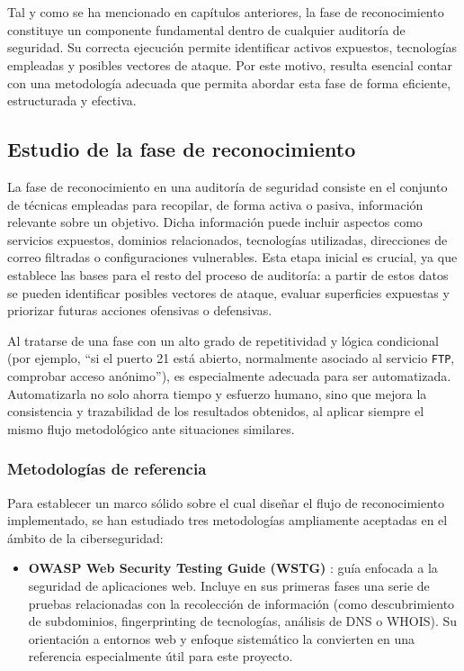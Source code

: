 \chapter{\methodologyname}
\newpage
\begin{parskipenv}
Tal y como se ha mencionado en capítulos anteriores, la fase de reconocimiento constituye un componente fundamental dentro de cualquier auditoría de seguridad. Su correcta ejecución permite identificar activos expuestos, tecnologías empleadas y posibles vectores de ataque. Por este motivo, resulta esencial contar con una metodología adecuada que permita abordar esta fase de forma eficiente, estructurada y efectiva.

\section{Estudio de la fase de reconocimiento}

La fase de reconocimiento en una auditoría de seguridad consiste en el conjunto de técnicas empleadas para recopilar, de forma activa o pasiva, información relevante sobre un objetivo. Dicha información puede incluir aspectos como servicios expuestos, dominios relacionados, tecnologías utilizadas, direcciones de correo filtradas o configuraciones vulnerables. Esta etapa inicial es crucial, ya que establece las bases para el resto del proceso de auditoría: a partir de estos datos se pueden identificar posibles vectores de ataque, evaluar superficies expuestas y priorizar futuras acciones ofensivas o defensivas.

Al tratarse de una fase con un alto grado de repetitividad y lógica condicional (por ejemplo, “si el puerto 21 está abierto, normalmente asociado al servicio \texttt{FTP}, comprobar acceso anónimo”), es especialmente adecuada para ser automatizada. Automatizarla no solo ahorra tiempo y esfuerzo humano, sino que mejora la consistencia y trazabilidad de los resultados obtenidos, al aplicar siempre el mismo flujo metodológico ante situaciones similares.

\subsection{Metodologías de referencia}

Para establecer un marco sólido sobre el cual diseñar el flujo de reconocimiento implementado, se han estudiado tres metodologías ampliamente aceptadas en el ámbito de la ciberseguridad:

\begin{itemize}
  \item \textbf{OWASP Web Security Testing Guide (WSTG)} \cite{owaspMethodology}: guía enfocada a la seguridad de aplicaciones web. Incluye en sus primeras fases una serie de pruebas relacionadas con la recolección de información (como descubrimiento de subdominios, fingerprinting de tecnologías, análisis de DNS o WHOIS). Su orientación a entornos web y enfoque sistemático la convierten en una referencia especialmente útil para este proyecto.


\end{itemize}
\end{parskipenv}
